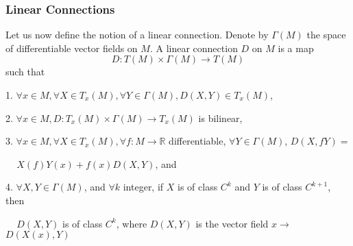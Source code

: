 \documentclass[12pt,hyperref,a4paper,UTF8]{ctexart}
\begin{document}
\subsubsection{Linear Connections}
Let us now define the notion of a linear connection. Denote by $\Gamma(M)$ the space of differentiable vector fields on $M$. A linear connection $D$ on $M$ is a map
$$
D: T(M) \times \Gamma(M) \rightarrow T(M)
$$
such that

1. $\forall x \in M, \forall X \in T_x(M), \forall Y \in \Gamma(M), D(X, Y) \in T_x(M)$,

2. $\forall x \in M, D: T_x(M) \times \Gamma(M) \rightarrow T_x(M)$ is bilinear,

3. $\forall x \in M, \forall X \in T_x(M), \forall f: M \rightarrow \mathbb{R}$ differentiable, $\forall Y \in \Gamma(M)$, $D(X, f Y)=$

$\quad\, X(f) Y(x)+f(x) D(X, Y)$, and

4. $\forall X, Y \in \Gamma(M)$, and $\forall k$ integer, if $X$ is of class $C^k$ and $Y$ is of class $C^{k+1}$, then 

$\quad\, D(X, Y)$ is of class $C^k$, where $D(X, Y)$ is the vector field $x \rightarrow$ $D(X(x), Y)$
\end{document}

